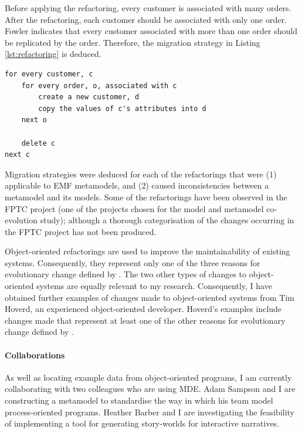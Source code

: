 Before applying the refactoring, every customer is associated with many orders. After the refactoring, each customer should be associated with only one order. Fowler indicates that every customer associated with more than one order should be replicated by the order. Therefore, the migration strategy in Listing \ref{lst:refactoring} is deduced.

\begin{lstlisting}[caption=Migration strategy for the refactoring in pseudo code., label=lst:refactoring]
for every customer, c
	for every order, o, associated with c
		create a new customer, d
		copy the values of c's attributes into d
	next o
	
	delete c
next c
\end{lstlisting}

Migration strategies were deduced for each of the refactorings that were (1) applicable to EMF metamodels, and (2) caused inconsistencies between a metamodel and its models. Some of the refactorings have been observed in the FPTC project (one of the projects chosen for the model and metamodel co-evolution study); although a thorough categorisation of the changes occurring in the FPTC project has not been produced.

Object-oriented refactorings are used to improve the maintainability of existing systems. Consequently, they represent only one of the three reasons for evolutionary change defined by \cite{sjoberg93quantifying}. The two other types of changes to object-oriented systems are equally relevant to my research. Consequently, I have obtained further examples of changes made to object-oriented systems from Tim Hoverd, an experienced object-oriented developer. Hoverd's examples include changes made that represent at least one of the other reasons for evolutionary change defined by \cite{sjoberg93quantifying}.



\paragraph{Collaborations} %
\label{par:collaborations}
As well as locating example data from object-oriented programs, I am currently collaborating with two colleagues who are using MDE. Adam Sampson and I are constructing a metamodel to standardise the way in which his team model process-oriented programs. Heather Barber and I are investigating the feasibility of implementing a tool for generating story-worlds for interactive narratives.

